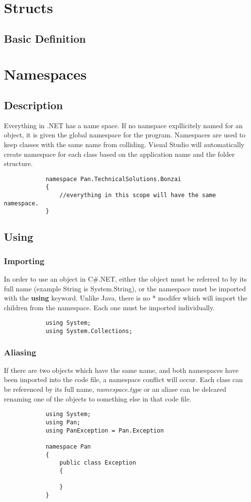 \documentclass {amsart}
\begin{document}
\section{Structs}
	\subsection{Basic Definition}
	

\section{Namespaces}
	\subsection{Description} Everything in .NET has a name space.  If no namspace expllicitely named for an object, it is given the global namespace for the program.  Namespaces are used to keep classes with the same name from colliding.  Visual Studio will automatically create namespace for each class based on the application name and the folder structure. 

		\begin{lstlisting}
			namespace Pan.TechnicalSolutions.Bonzai
			{
				//everything in this scope will have the same namespace.  
			}
		\end{lstlisting}

	\subsection {Using}
		\subsubsection {Importing}  In order to use an object in C\#.NET, either the object must be referred to by its full name (example String is System.String), or the namespace must be imported with the {\bf using} keyword.  Unlike Java, there is no * modifer which will import the children from the namespace.  Each one must be imported individually. 
		\begin{lstlisting}
			using System;
			using System.Collections;
		\end{lstlisting}

		\subsubsection {Aliasing} If there are two objects which have the same name, and both namespaces have been imported into the code file, a namespace conflict will occur.  Each class can be referenced by its full name, \emph{namespace.type} or an aliase can be delcared renaming one of the objects to something else in that code file.  
		\begin{lstlisting}
			using System;
			using Pan;
			using PanException = Pan.Exception

			namespace Pan
			{
				public class Exception
				{
	
				}
			}
		\end{lstlisting}
\end{document}
